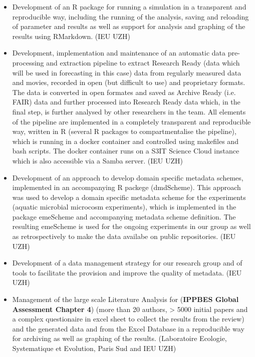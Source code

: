 \documentclass[a4paper]{article}
\begin{document}
\begin{itemize}[leftmargin=1.1in]

\item Development of an R package for running a simulation in a
	transparent and reproducible way, including the running of the
	analysis, saving and reloading of parameter and results as well as
	support for analysis and graphing of the results using RMarkdown. (IEU UZH)

\item Development, implementation and maintenance of an automatic data
	pre-processing and extraction pipeline to extract Research Ready
	(data which will be used in forecasting in this case) data from
	regularly measured data and movies, recorded in open (but
	difficult to use) and proprietary formats. The data is converted in
	open formates and saved as Archive Ready (i.e. FAIR) data and further
	processed into Research Ready data which, in the final step,  is
	further analysed by other researchers in the team. All elements of
	the pipeline are implemented in a completely transparent and
	reproducible way, written in R (several R packages to
	compartmentalise the pipeline), which is running in a docker
	container and controlled using makefiles and bash scripts. The docker
	container runs on a S3IT Science Cloud instance which is also
	accessible via a Samba server. (IEU UZH)

\item Development of an approach to develop domain specific metadata
	schemes, implemented in an accompanying R packege (dmdScheme). This
	approach was used to develop a domain specific metadata scheme for
	the experiments (aquatic microbial microcosm experiments), which is
	implemented in the package emeScheme and accompanying metadata scheme
	definition. The resulting emeScheme is used for the ongoing
	experiments in our group as well as retrospectively to make the data
	availabe on public repositories. (IEU UZH)

\item Development of a data management strategy for our research group
	and of tools to facilitate the provision and improve the quality of
	metadata. (IEU UZH)


\item Management of the large scale Literature Analysis for
	(\textbf{IPPBES Global Assessment Chapter 4}) (more than 20 authors,
	> 5000 initial papers and a complex questionaire in excel sheet to
	collect the results from the review) and the generated data and from
	the Excel Database in a reproducible way for archiving as well as
	graphing of the results. (Laboratoire Ecologie, Systematique et Evolution, Paris
	Sud and IEU UZH)


\end{itemize}
\end{document}

